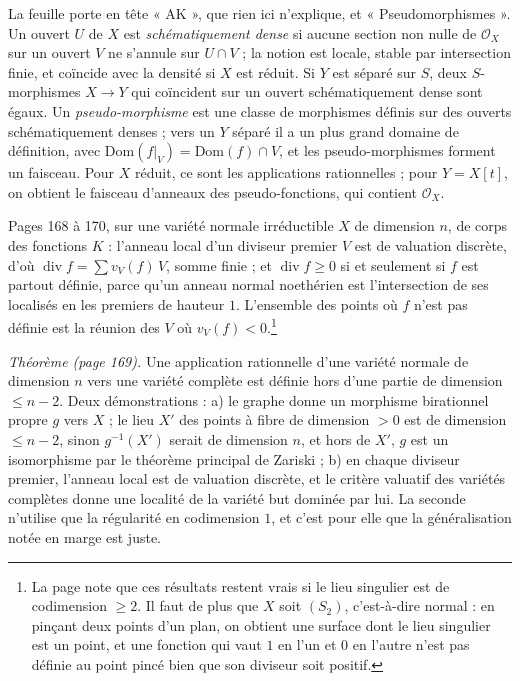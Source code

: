 \documentclass[11pt,a4paper]{article}
\begin{document}
La feuille porte en tête « AK », que rien ici n'explique, et « Pseudomorphismes ».
Un ouvert $U$ de $X$ est \emph{schématiquement dense} si aucune section non
nulle de $\mathcal{O}_X$ sur un ouvert $V$ ne s'annule sur $U \cap V$ ; la
notion est locale, stable par intersection finie, et coïncide avec la densité
si $X$ est réduit. Si $Y$ est séparé sur $S$, deux $S$-morphismes $X \to Y$
qui coïncident sur un ouvert schématiquement dense sont égaux. Un
\emph{pseudo-morphisme} est une classe de morphismes définis sur des ouverts
schématiquement denses ; vers un $Y$ séparé il a un plus grand domaine de
définition, avec $\mathrm{Dom}(f|_V) = \mathrm{Dom}(f) \cap V$, et les
pseudo-morphismes forment un faisceau. Pour $X$ réduit, ce sont les
applications rationnelles ; pour $Y = X[t]$, on obtient le faisceau d'anneaux
des pseudo-fonctions, qui contient $\mathcal{O}_X$.

Pages 168 à 170, sur une variété normale irréductible $X$ de dimension $n$,
de corps des fonctions $K$ : l'anneau local d'un diviseur premier $V$ est de
valuation discrète, d'où $\operatorname{div} f = \sum v_V(f)\,V$, somme finie ;
et $\operatorname{div} f \geq 0$ si et seulement si $f$ est partout définie,
parce qu'un anneau normal noethérien est l'intersection de ses localisés en
les premiers de hauteur $1$. L'ensemble des points où $f$ n'est pas définie est
la réunion des $V$ où $v_V(f) < 0$.\footnote{La page note que ces résultats
restent vrais si le lieu singulier est de codimension $\geq 2$. Il faut de plus
que $X$ soit $(S_2)$, c'est-à-dire normal : en pinçant deux points d'un plan,
on obtient une surface dont le lieu singulier est un point, et une fonction
qui vaut $1$ en l'un et $0$ en l'autre n'est pas définie au point pincé bien
que son diviseur soit positif.}

\emph{Théorème (page 169).} Une application rationnelle d'une variété normale
de dimension $n$ vers une variété complète est définie hors d'une partie de
dimension $\leq n - 2$. Deux démonstrations : a) le graphe donne un morphisme
birationnel propre $g$ vers $X$ ; le lieu $X'$ des points à fibre de dimension
$> 0$ est de dimension $\leq n - 2$, sinon $g^{-1}(X')$ serait de dimension
$n$, et hors de $X'$, $g$ est un isomorphisme par le théorème principal de
Zariski ; b) en chaque diviseur premier, l'anneau local est de valuation
discrète, et le critère valuatif des variétés complètes donne une localité de
la variété but dominée par lui. La seconde n'utilise que la régularité en
codimension $1$, et c'est pour elle que la généralisation notée en marge est
juste.
\end{document}
